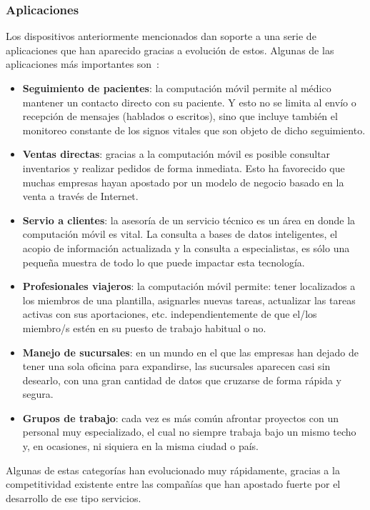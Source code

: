   \subsubsection{Aplicaciones}
Los dispositivos anteriormente mencionados dan soporte a una serie de
aplicaciones que han aparecido gracias a evolución de estos.
Algunas de las aplicaciones más importantes son~\cite{bib:micMobileComputing}:
\begin{itemize}
\item \textbf{Seguimiento de pacientes}: la computación móvil permite al
médico mantener un contacto directo con su paciente. Y esto no se limita
al envío o recepción de mensajes (hablados o escritos), sino que incluye
también el monitoreo constante de los signos vitales que son objeto de dicho
seguimiento.
\item \textbf{Ventas directas}: gracias a la computación móvil es posible
consultar inventarios y realizar pedidos de forma inmediata. Esto ha favorecido
que muchas empresas hayan apostado por un modelo de negocio basado en la
venta a través de Internet.
\item \textbf{Servio a clientes}: la asesoría de un servicio técnico es un
área en donde la computación móvil es vital. La consulta a bases de datos
inteligentes, el acopio de información actualizada y la consulta a
especialistas, es sólo una pequeña muestra de todo lo que puede impactar
esta tecnología.
\item \textbf{Profesionales viajeros}: la computación móvil permite:
tener localizados a los miembros de una plantilla, asignarles nuevas tareas,
actualizar las tareas activas con sus aportaciones, etc. independientemente
de que el/los miembro/s estén en su puesto de trabajo habitual o no.
\item \textbf{Manejo de sucursales}: en un mundo en el que las empresas han
dejado de tener una sola oficina para expandirse, las sucursales aparecen casi
sin desearlo, con una gran cantidad de datos que cruzarse de forma rápida y
segura.
\item \textbf{Grupos de trabajo}: cada vez es más común afrontar proyectos
con un personal muy especializado, el cual no siempre trabaja bajo un mismo
techo y, en ocasiones, ni siquiera en la misma ciudad o país.
\end{itemize}

Algunas de estas categorías han evolucionado muy rápidamente, gracias a la
competitividad existente entre las compañías que han apostado fuerte por el
desarrollo de ese tipo servicios.

